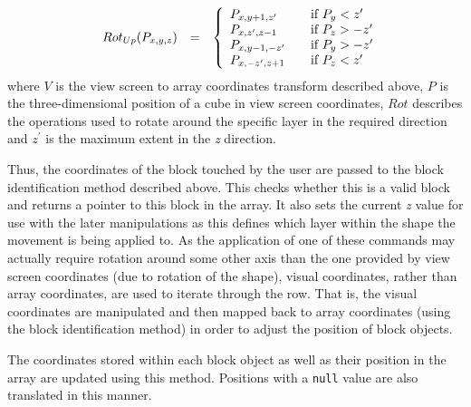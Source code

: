 \begin{align*}
\begin{array}{ l l l l l l }
			& Rot_{Up}(P_{x,y,z})& = & \left\{  \begin{array}{l l l}
			  P_{x,y+1,z^{\prime}} & \quad \mbox{if } P_y < z^{\prime} \\ 
			  P_{x,z^{\prime},z-1} & \quad \mbox{if } P_z > -z^{\prime} \\ 
			  P_{x,y-1,-z^{\prime}} & \quad \mbox{if } P_y > -z^{\prime} \\ 
			  P_{x,-z^{\prime},z+1} & \quad \mbox{if } P_z < z^{\prime} \\ 
			 \end{array} \right. \\
	\end{array} \\
\end{align*}
\normalsize
where $V$ is the view screen to array coordinates transform described above, $P$ is the three-dimensional position of a cube in view screen coordinates, $Rot$ describes the operations used to rotate around the specific layer in the required direction and $z^{\prime}$ is the maximum extent in the \emph{z} direction.

Thus, the coordinates of the block touched by the user are passed to the block identification method described above. This checks whether this is a valid block and returns a pointer to this block in the array. It also sets the current \emph{z} value for use with the later manipulations as this defines which layer within the shape the movement is being applied to. As the application of one of these commands may actually require rotation around some other axis than the one provided by view screen coordinates (due to rotation of the shape), visual coordinates, rather than array coordinates, are used to iterate through the row. That is, the visual coordinates are manipulated and then mapped back to array coordinates (using the block identification method) in order to adjust the position of block objects. 

The coordinates stored within each block object as well as their position in the array are updated using this method. Positions with a \texttt{null} value are also translated in this manner.

